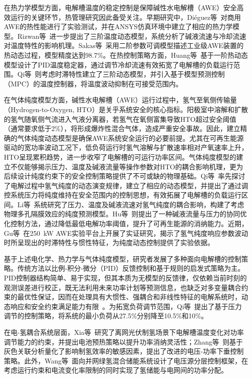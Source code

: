在热力学模型方面，电解槽温度的稳定控制是保障碱性水电解槽（AWE）安全高效运行的关键环节，热管理研究因此备受关注。早期研究中，Di\'{e}guez等~\cite{Dieguez2008}对商用AWE的热性能进行了实验测试，并在ANSYS仿真环境中建立了相应的热力学模型。Rizwan等~\cite{Rizwan2021}进一步提出了三阶温度动态模型，系统分析了碱液流速与冷却流速对温度特性的影响机理。Sakas等~\cite{Sakas2022}采用二阶参数可调模型描述工业级AWE装置的热动态过程，模型精度达到98.7\%。在热控制策略方面，Huang等~\cite{Huang2023EnergyReports}基于一阶热动态模型设计了PID温度稳定器，通过调节冷却流速有效拓宽了电解槽的负载运行范围。Qi等~\cite{Qi2022AppliedEnergy}则考虑时滞特性建立了三阶动态模型，并引入基于模型预测控制（MPC）的温度控制器，将温度波动抑制在可接受范围内。

在气体纯度模型方面，碱性水电解槽（AWE）运行过程中，氢气至氧侧传输量（Hydrogen-to-Oxygen, HTO）是关乎系统安全的核心指标。阳极室中溶解和扩散的氢气随氧侧气流进入气液分离器，若氢气在氧侧富集导致HTO超过安全阈值（通常要求低于2\%），将形成爆炸性混合气体，造成严重安全事故。因此，建立精确的气体纯度动态模型是确保AWE系统安全运行的必要前提。尤其在可再生能源驱动的宽功率波动工况下，低负荷运行时氢气溶解与扩散速率相对产氧速率上升，HTO呈现累积趋势，进一步收窄了电解槽的可运行功率区间。气体纯度模型的建立不仅能够揭示压力、温度及碱液流量等操作参数对HTO的耦合影响机理，更为后续设计纯度约束下的安全控制策略提供了不可或缺的物理基础。Qi等~\cite{Qi2021IJHE}率先探讨了电解过程中氢气纯度的动态演变规律，建立了相应的动态模型，并提出了通过调控系统压力将纯度维持在安全范围内的控制思想，有效拓展了电解槽的负载运行区间。Li等~\cite{Li2022AppliedEnergyActive}系统研究了压力、温度及碱液流速对氢气纯度的耦合影响，构建了考虑物理多孔隔膜效应的纯度预测模型。Hu等~\cite{Hu2024eTransportation}则提出了一种碱液流量与压力的协同优化控制方法，通过降低最低电解功率阈值，提升了可再生能源的消纳能力。近期，Gu等~\cite{Gu2024JPS}在250~kW AWE实验平台上开展了实证研究，揭示了氢气纯度响应参数波动时所呈现出的时滞特性与惯性特征，为纯度动态控制提供了实验依据。

基于上述电化学、热力学与气体纯度模型，研究者发展了多种面向电解槽的控制策略。传统方法以比例-积分-微分（PID）反馈控制和基于规则的启发式策略为主。PID控制器结构简单、易于实现，但其本质为无模型的反馈律，仅依赖当前时刻的观测误差进行校正，既无法利用未来功率计划等预测信息，也缺乏对多变量耦合约束的最优性保证，因而在处理具有大惯性、强耦合和非线性特征的电解系统时，动态响应和安全约束满足能力有限~\cite{Li2024IJHE_chemeng}。为拓宽负荷调节范围，Qi等~\cite{Qi2021IJHE}提出了基于压力调节的控制策略，将系统的最小负荷从27.5\%分别降至10.5\%和10\%。

在电-氢耦合系统层面，Xia等~\cite{Xia2025TPEL}研究了离网光伏制氢场景下电解槽温度变化对功率调节能力的约束，并提出电池预热策略以提升功率消纳灵活性；Zhang等~\cite{Zhang2025EPSR}则基于灰色关联分析量化了影响制氢效率的敏感因素，提出了改进的电压-功率下垂控制策略。此外，Wang等~\cite{Wang2025TSG}面向并网绿氢混合储能系统设计了电压源分层控制框架，在考虑运行约束和电流变化率限制的同时实现了氢储能与电网间的功率分配。

